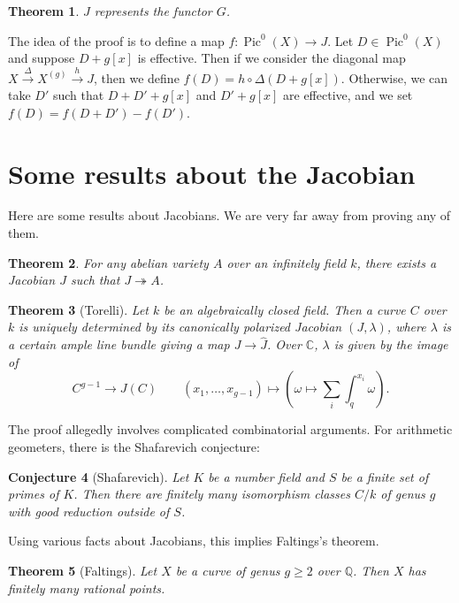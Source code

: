 \documentclass[leqno, openany]{memoir}
\newtheorem{thm}{Theorem}[section]
\newtheorem{conj}[thm]{Conjecture}
\theoremstyle{definition}
\theoremstyle{remark}
\theoremstyle{plain}
\theoremstyle{definition}
\theoremstyle{remark}
\newcommand{\C}{\mathbb{C}}
\newcommand{\Q}{\mathbb{Q}}
\newcommand{\wh}[1]{\widehat{#1}}
\DeclareMathOperator{\Pic}{Pic}
\begin{document}
\begin{thm} $J$ represents the functor $G$.  \end{thm}

The idea of the proof is to define a map $f \colon \Pic^0(X) \to J$. Let $D \in
\Pic^0(X)$ and suppose $D + g[x]$ is effective. Then if we consider the
diagonal map $X \xrightarrow{\Delta} X^{(g)} \xrightarrow{h} J$, then we define
$f(D) = h \circ \Delta (D + g[x])$. Otherwise, we can take $D'$ such that $D +
D' + g[x]$ and $D' + g[x]$ are effective, and we set $f(D) = f(D + D') -
f(D')$.

\section{Some results about the Jacobian}%
\label{sec:some_results_about_the_jacobian}

Here are some results about Jacobians. We are very far away from proving any of
them.

\begin{thm} For any abelian variety $A$ over an infinitely field $k$, there
exists a Jacobian $J$ such that $J \twoheadrightarrow A$.  \end{thm}

\begin{thm}[Torelli] Let $k$ be an algebraically closed field. Then a curve $C$
    over $k$ is uniquely determined by its canonically polarized Jacobian $(J,
    \lambda)$, where $\lambda$ is a certain ample line bundle giving a map $J
    \to \wh{J}$. Over $\C$, $\lambda$ is given by the image of \[ C^{g-1} \to
    J(C) \qquad (x_1, \ldots, x_{g-1}) \mapsto (\omega \mapsto \sum_i
\int_q^{x_i} \omega). \] \end{thm}

The proof allegedly involves complicated combinatorial arguments. For
arithmetic geometers, there is the Shafarevich conjecture:

\begin{conj}[Shafarevich] Let $K$ be a number field and $S$ be a finite set of
primes of $K$. Then there are finitely many isomorphism classes $C/k$ of genus
$g$ with good reduction outside of $S$.  \end{conj}

Using various facts about Jacobians, this implies Faltings's theorem.

\begin{thm}[Faltings] Let $X$ be a curve of genus $g \geq 2$ over $\Q$. Then
$X$ has finitely many rational points.  \end{thm}
\end{document}
